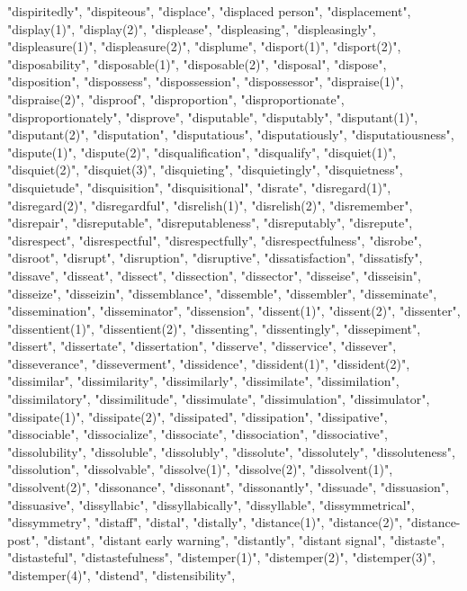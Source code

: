 "dispiritedly",
"dispiteous",
"displace",
"displaced person",
"displacement",
"display(1)",
"display(2)",
"displease",
"displeasing",
"displeasingly",
"displeasure(1)",
"displeasure(2)",
"displume",
"disport(1)",
"disport(2)",
"disposability",
"disposable(1)",
"disposable(2)",
"disposal",
"dispose",
"disposition",
"dispossess",
"dispossession",
"dispossessor",
"dispraise(1)",
"dispraise(2)",
"disproof",
"disproportion",
"disproportionate",
"disproportionately",
"disprove",
"disputable",
"disputably",
"disputant(1)",
"disputant(2)",
"disputation",
"disputatious",
"disputatiously",
"disputatiousness",
"dispute(1)",
"dispute(2)",
"disqualification",
"disqualify",
"disquiet(1)",
"disquiet(2)",
"disquiet(3)",
"disquieting",
"disquietingly",
"disquietness",
"disquietude",
"disquisition",
"disquisitional",
"disrate",
"disregard(1)",
"disregard(2)",
"disregardful",
"disrelish(1)",
"disrelish(2)",
"disremember",
"disrepair",
"disreputable",
"disreputableness",
"disreputably",
"disrepute",
"disrespect",
"disrespectful",
"disrespectfully",
"disrespectfulness",
"disrobe",
"disroot",
"disrupt",
"disruption",
"disruptive",
"dissatisfaction",
"dissatisfy",
"dissave",
"disseat",
"dissect",
"dissection",
"dissector",
"disseise",
"disseisin",
"disseize",
"disseizin",
"dissemblance",
"dissemble",
"dissembler",
"disseminate",
"dissemination",
"disseminator",
"dissension",
"dissent(1)",
"dissent(2)",
"dissenter",
"dissentient(1)",
"dissentient(2)",
"dissenting",
"dissentingly",
"dissepiment",
"dissert",
"dissertate",
"dissertation",
"disserve",
"disservice",
"dissever",
"disseverance",
"disseverment",
"dissidence",
"dissident(1)",
"dissident(2)",
"dissimilar",
"dissimilarity",
"dissimilarly",
"dissimilate",
"dissimilation",
"dissimilatory",
"dissimilitude",
"dissimulate",
"dissimulation",
"dissimulator",
"dissipate(1)",
"dissipate(2)",
"dissipated",
"dissipation",
"dissipative",
"dissociable",
"dissocialize",
"dissociate",
"dissociation",
"dissociative",
"dissolubility",
"dissoluble",
"dissolubly",
"dissolute",
"dissolutely",
"dissoluteness",
"dissolution",
"dissolvable",
"dissolve(1)",
"dissolve(2)",
"dissolvent(1)",
"dissolvent(2)",
"dissonance",
"dissonant",
"dissonantly",
"dissuade",
"dissuasion",
"dissuasive",
"dissyllabic",
"dissyllabically",
"dissyllable",
"dissymmetrical",
"dissymmetry",
"distaff",
"distal",
"distally",
"distance(1)",
"distance(2)",
"distance-post",
"distant",
"distant early warning",
"distantly",
"distant signal",
"distaste",
"distasteful",
"distastefulness",
"distemper(1)",
"distemper(2)",
"distemper(3)",
"distemper(4)",
"distend",
"distensibility",
